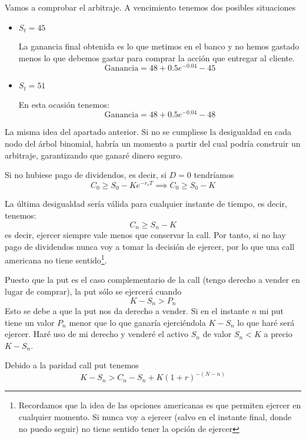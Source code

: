\begin{problem}[5]
\begin{example}
Vamos a comprobar el arbitraje. A vencimiento tenemos dos posibles situaciones
\begin{itemize}
\item $S_t=45$

La ganancia final obtenida es lo que metimos en el banco y no hemos gastado menos lo que debemos gastar para comprar la acción que entregar al cliente.
\[\text{Ganancia} = 48 + 0.5 e^{-0.04}-45 \]
\item $S_t=51$

En esta ocasión tenemos:
\[\text{Ganancia} = 48 + 0.5e^{-0.04} - 48\]
\end{itemize}

\end{example}

\spart

La misma idea del apartado anterior. Si no se cumpliese la desigualdad en cada nodo del árbol binomial, habría un momento a partir del cual podría construir un arbitraje, garantizando que ganaré dinero seguro.

\spart

Si no hubiese pago de dividendos, es decir, si $D=0$ tendríamos
\[C_0 \geq S_0-Ke^{-r_cT} \implies C_0 \geq S_0-K\]

La última desigualdad sería válida para cualquier instante de tiempo, es decir, tenemos:
\[C_n \geq S_n-K\]
es decir, ejercer siempre vale menos que conservar la call. Por tanto, si no hay pago de dividendos nunca voy a tomar la decisión de ejercer, por lo que una call americana no tiene sentido\footnote{Recordamos que la idea de las opciones americanas es que permiten ejercer en cualquier momento. Si nunca voy a ejercer (salvo en el instante final, donde no puedo seguir) no tiene sentido tener la opción de ejercer}.

\spart

Puesto que la put es el caso complementario de la call (tengo derecho a vender en lugar de comprar), la put sólo se ejercerá cuando
\[K-S_n > P_n\]
Esto se debe a que la put nos da derecho a vender. Si en el instante $n$ mi put tiene un valor $P_n$ menor que lo que ganaría ejerciéndola $K-S_n$ lo que haré será ejercer. Haré uso de mi derecho y venderé el activo $S_n$ de valor $S_n<K$ a precio $K-S_n$.

Debido a la paridad call put tenemos
\[K-S_n > C_n - S_n + K(1+r)^{-(N-n)}\]

\end{problem}

